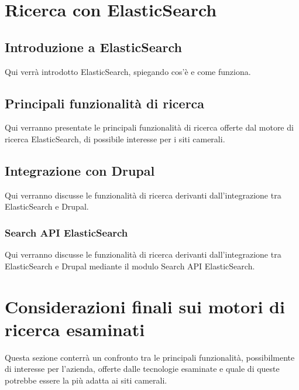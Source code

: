 	\section{Ricerca con ElasticSearch}
	
		\subsection{Introduzione a ElasticSearch}
		Qui verrà introdotto ElasticSearch, spiegando cos'è e come funziona.

		\subsection{Principali funzionalità di ricerca}
		Qui verranno presentate le principali funzionalità di ricerca offerte dal motore di ricerca ElasticSearch, di possibile interesse per i siti camerali.
		
		\subsection{Integrazione con Drupal}
		Qui verranno discusse le funzionalità di ricerca derivanti dall'integrazione tra ElasticSearch e Drupal.
		
			\subsubsection{Search API ElasticSearch}
			Qui verranno discusse le funzionalità di ricerca derivanti dall'integrazione tra ElasticSearch e Drupal mediante il modulo Search API ElasticSearch.
			
	\section{Considerazioni finali sui motori di ricerca esaminati}
	Questa sezione conterrà un confronto tra le principali funzionalità, possibilmente di interesse per l'azienda, offerte dalle tecnologie esaminate e quale di queste potrebbe essere la più adatta ai siti camerali.